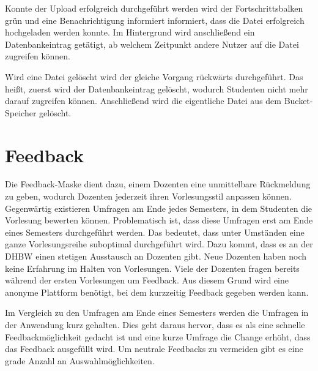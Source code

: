 Konnte der Upload erfolgreich durchgeführt werden wird der Fortschrittsbalken grün und eine Benachrichtigung informiert informiert, dass die Datei erfolgreich hochgeladen werden konnte.
Im Hintergrund wird anschließend ein Datenbankeintrag getätigt, ab welchem Zeitpunkt andere Nutzer auf die Datei zugreifen können.

Wird eine Datei gelöscht wird der gleiche Vorgang rückwärts durchgeführt.
Das heißt, zuerst wird der Datenbankeintrag gelöscht, wodurch Studenten nicht mehr darauf zugreifen können.
Anschließend wird die eigentliche Datei aus dem Bucket-Speicher gelöscht.











\section{Feedback}
Die Feedback-Maske dient dazu, einem Dozenten eine unmittelbare Rückmeldung zu geben, wodurch Dozenten jederzeit ihren Vorlesungsstil anpassen können.
Gegenwärtig existieren Umfragen am Ende jedes Semesters, in dem Studenten die Vorlesung bewerten können.
Problematisch ist, dass diese Umfragen erst am Ende eines Semesters durchgeführt werden.
Das bedeutet, dass unter Umständen eine ganze Vorlesungsreihe suboptimal durchgeführt wird.
Dazu kommt, dass es an der DHBW einen stetigen Ausstausch an Dozenten gibt.
Neue Dozenten haben noch keine Erfahrung im Halten von Vorlesungen.
Viele der Dozenten fragen bereits während der ersten Vorlesungen um Feedback.
Aus diesem Grund wird eine anonyme Plattform benötigt, bei dem kurzzeitig Feedback gegeben werden kann.

Im Vergleich zu den Umfragen am Ende eines Semesters werden die Umfragen in der Anwendung kurz gehalten.
Dies geht daraus hervor, dass es als eine schnelle Feedbackmöglichkeit gedacht ist und eine kurze Umfrage die Change erhöht, dass das Feedback ausgefüllt wird.
Um neutrale Feedbacks zu vermeiden gibt es eine grade Anzahl an Auswahlmöglichkeiten. 



